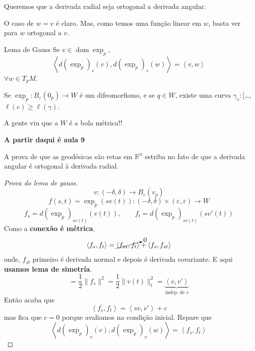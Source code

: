 Queremos que a derivada radial seja ortogonal a derivada angular.

\begin{upshot}\leavevmode
O caso de \(w=v\) é claro. Mas, como temos uma função linear em \(w\), basta ver para \(w\) ortogonal a \(v\).
\end{upshot}

\begin{thing8}{Lema de Gauss}\leavevmode
Se \(v \in \operatorname{dom} \operatorname{exp}_p\),
\[\left<d(\operatorname{exp}_p)_v(v),d(\operatorname{exp}_p)_v(w)\right>=\left<v,w\right>\]
\(\forall w \in T_pM\).
\end{thing8}

\begin{coro}\leavevmode
Se \(\operatorname{exp}_p:B_\varepsilon(0_p) \to W\) é um difeomorfismo, e se \(q \in W\), existe uma curva \(\gamma_v:[\)…, \(\ell(c) \geq  \ell(\gamma)\).
\end{coro}

\begin{upshot}\leavevmode
A gente viu que a \(W\) é a bola métrica!!
\end{upshot}

\textbf{A partir daqui é aula 9} 

\begin{upshot}\leavevmode
A prova de que as geodésicas são retas em \(\mathbb{R}^n\) estriba no fato de que a derivada angular é ortogonal à derivada radial.
\end{upshot}

\begin{proof}[Prova do lema de gauss]\leavevmode
\[v:(-\delta,\delta)\to B_\varepsilon(v_p)\]
\[f(s,t)=\operatorname{exp}_p(sv(t)):(-\delta,\delta)\times (\varepsilon,\varepsilon)\to W\]
\[f_s=d(\operatorname{exp}_p)_{sv(t)}(v(t)),\qquad f_t=d(\operatorname{exp}_p)_{sv(t)}(sv'(t))\]
Como a \textbf{conexão é métrica},
\[\left<f_s,f_t\right>=\cancelto{0}{\left<f_{ss},f_t\right>}+\left<f_s,f_{st}\right>\]
onde, \(f_{s t}\) primeiro é derivada normal e depois é derivada covariante. E aqui \textbf{usamos lema de simetría}.
\[=\frac{1}{2}\|f_s\|^2=\frac{1}{2}\|v(t)\|^2_t=\underbrace{\left<v,v'\right>}_{\text{indep. de \(s\)} }\]
Então acaba que
\[\left<f_s,f_t\right>=\left<sv,v'\right>+c\]
mas fica que \(c=0\) porque avaliamos na condição inicial. Repare que
\[\left<d(\operatorname{exp}_p)_v(v),d(\operatorname{exp}_p)_v(w)\right>=\left<f_s,f_t\right>\]

\end{proof}

